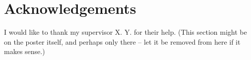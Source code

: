\documentclass{ExcelAtFIT}
\begin{document}
\section*{Acknowledgements}
I would like to thank my supervisor X. Y. for their help.  (This section might be on the poster itself, and perhaps only there -- let it be removed from here if it makes sense.)




\end{document}
